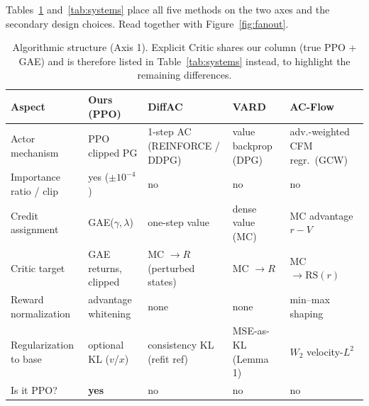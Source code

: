 \documentclass[11pt]{article}
\theoremstyle{remark}
\begin{document}
Tables~\ref{tab:algo} and~\ref{tab:systems} place all five methods on the two axes and
the secondary design choices. Read together with Figure~\ref{fig:fanout}.

\begin{table}[h]
\centering
\footnotesize
\setlength{\tabcolsep}{4pt}
\begin{tabular}{p{2.3cm} p{2.3cm} p{2.3cm} p{2.3cm} p{2.3cm}}
\toprule
\textbf{Aspect} & \textbf{Ours (PPO)} & \textbf{DiffAC} & \textbf{VARD} & \textbf{AC-Flow} \\
\midrule
Actor mechanism & PPO clipped PG & 1-step AC (REINFORCE / DDPG) & value backprop (DPG) & adv.-weighted CFM regr.\ (GCW) \\
Importance ratio / clip & yes ($\pm10^{-4}$) & no & no & no \\
Credit assignment & GAE($\gamma,\lambda$) & one-step value & dense value (MC) & MC advantage $r{-}V$ \\
Critic target & GAE returns, clipped & MC $\to R$ (perturbed states) & MC $\to R$ & MC $\to \mathrm{RS}(r)$ \\
Reward normalization & advantage whitening & none & none & min--max shaping \\
Regularization to base & optional KL ($v$/$x$) & consistency KL (refit ref) & MSE-as-KL (Lemma 1) & $W_2$ velocity-$L^2$ \\
Is it PPO? & \textbf{yes} & no & no & no \\
\bottomrule
\end{tabular}
\caption{Algorithmic structure (Axis 1). Explicit Critic shares our column (true PPO +
GAE) and is therefore listed in Table~\ref{tab:systems} instead, to highlight the
remaining differences.}
\label{tab:algo}
\end{table}
\end{document}
